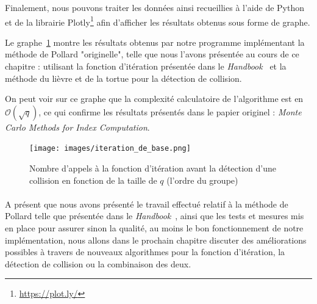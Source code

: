      Finalement, nous pouvons traiter les données ainsi recueillies à l'aide de Python et de la librairie Plotly\footnote{\url{https://plot.ly/}} afin d'afficher les résultats obtenus sous forme de graphe.

      Le graphe~\ref{fig:basic_iteration_results} montre les résultats obtenus par notre programme implémentant la méthode de Pollard "originelle", telle que nous l'avons présentée au cours de ce chapitre : utilisant la fonction d'itération présentée dans le \textit{Handbook}~\autocite[107]{handbook} et la méthode du lièvre et de la tortue pour la détection de collision.

      On peut voir sur ce graphe que la complexité calculatoire de l'algorithme est en $\mathcal{O}(\sqrt{q})$, ce qui confirme les résultats présentés dans le papier originel : \textit{Monte Carlo Methods for Index Computation}\autocite{pollard0}.

      \begin{figure}
        \center{}
        \texttt{[image: images/iteration\_de\_base.png]}
        \caption{Nombre d'appels à la fonction d'itération avant la détection d'une collision en fonction de la taille de $q$ (l'ordre du groupe)}
        \label{fig:basic_iteration_results}
      \end{figure}


    \paragraph{}
    A présent que nous avons présenté le travail effectué relatif à la méthode de Pollard telle que présentée dans le \textit{Handbook}~\autocite[106]{handbook}, ainsi que les tests et mesures mis en place pour assurer sinon la qualité, au moins le bon fonctionnement de notre implémentation, nous allons dans le prochain chapitre discuter des améliorations possibles à travers de nouveaux algorithmes pour la fonction d'itération, la détection de collision ou la combinaison des deux.

